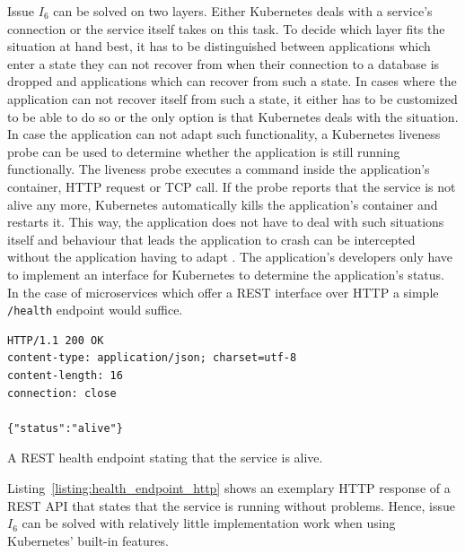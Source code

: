 Issue $I_6$ can be solved on two layers. Either Kubernetes deals with a
service's connection or the service itself takes on this task. To decide which
layer fits the situation at hand best, it has to be distinguished between
applications which enter a state they can not recover from when their
connection to a database is dropped and applications which can recover from
such a state. In cases where the application can not recover itself from such a
state, it either has to be customized to be able to do so or the only option is
that Kubernetes deals with the situation. In case the application can not adapt
such functionality, a Kubernetes liveness probe can be used to determine
whether the application is still running functionally. The liveness probe
executes a command inside the application's container, \ac{HTTP} request or
\ac{TCP} call. If the probe reports that the service is not alive any more,
Kubernetes automatically kills the application's container and restarts it.
This way, the application does not have to deal with such situations itself and
behaviour that leads the application to crash can be intercepted without the
application having to adapt \autocite{AuthorsConfigureLivenessReadiness2019}.
The application's developers only have to implement an interface for Kubernetes
to determine the application's status. In the case of microservices which offer
a \ac{REST} interface over \ac{HTTP} a simple \texttt{/health} endpoint would
suffice.

\begin{listing}[H]
  \begin{verbatim}
HTTP/1.1 200 OK
content-type: application/json; charset=utf-8
content-length: 16
connection: close

{"status":"alive"}
  \end{verbatim}
  \caption[A REST health endpoint stating that the service is alive.]{A
  \ac{REST} health endpoint stating that the service is alive.}%
  \label{listing:health_endpoint_http}
\end{listing}

Listing~\ref{listing:health_endpoint_http} shows an exemplary \ac{HTTP}
response of a \ac{REST} \ac{API} that states that the service is running
without problems. Hence, issue $I_6$ can be solved with relatively little
implementation work when using Kubernetes' built-in features.

